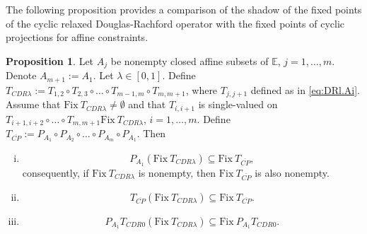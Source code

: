 \documentclass[12pt]{article}
\theoremstyle{definition}
\newtheorem{proposition}{Proposition}
\renewcommand{\equiv}{:=}
\newcommand{\dist}{\mathrm{dist}}
\newcommand{\Fix}{\mathrm{Fix}\ }
\begin{document}
The following proposition provides a comparison of the shadow of the fixed points of the cyclic relaxed Douglas-Rachford operator with the fixed points of cyclic projections for affine constraints.

\begin{proposition}\label{prop:shadow.fixed.point.subset.CP}
    Let $A_j$ be nonempty closed affine subsets of $\mathbb E$, $j=1,\dots,m$.
Denote $A_{m+1}:=A_1$.
Let $\lambda\in[0,1]$.
Define $T_{CDR\lambda}\equiv T_{1,2}\circ T_{2,3}\circ\dots\circ T_{m-1,m}\circ T_{m,m+1}$, where $T_{j,j+1}$
defined as in \eqref{eq:DRl.Ai}.
Assume that $\Fix T_{CDR\lambda}\neq\emptyset$ and that $T_{i,i+1}$ is single-valued on $T_{i+1,i+2}\circ\dots\circ T_{m,m+1}\Fix T_{CDR\lambda}$, $i=1,\dots,m$.
Define $T_{\overline{CP}}\equiv P_{A_1}\circ P_{A_2}\circ\dots\circ P_{A_{m}}\circ P_{A_1}$. Then
\begin{enumerate}[(i)]
\item\label{prop:shadow.fixed.point.subset.CP i}
\begin{equation}\label{eq:shadow.sunset.CP}
    P_{A_1}(\Fix T_{CDR\lambda})\subseteq \Fix T_{\overline{CP}},
\end{equation}
consequently, if $\Fix T_{CDR\lambda}$ is nonempty, then $\Fix T_{\overline{CP}}$ is also nonempty.
\item\label{prop:shadow.fixed.point.subset.CP ii}
\begin{equation}\label{e:extended CP}
    T_{\overline{CP}}(\Fix T_{CDR\lambda})\subseteq \Fix T_{\overline{CP}}.
\end{equation}
\item\label{prop:shadow.fixed.point.subset.CP iii}
\begin{equation}\label{e:CDR0}
    P_{A_1}T_{CDR0}(\Fix T_{CDR\lambda})\subseteq \Fix P_{A_1}T_{CDR0}.
\end{equation}
\end{enumerate}
\end{proposition}
\end{document}
